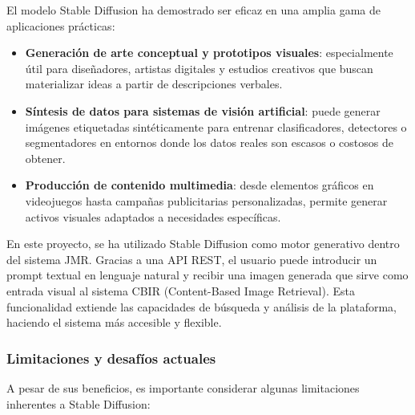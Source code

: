 El modelo Stable Diffusion ha demostrado ser eficaz en una amplia gama de aplicaciones prácticas:

\begin{itemize}
    \item \textbf{Generación de arte conceptual y prototipos visuales}: especialmente útil para diseñadores, artistas digitales y estudios creativos que buscan materializar ideas a partir de descripciones verbales.
    
    \item \textbf{Síntesis de datos para sistemas de visión artificial}: puede generar imágenes etiquetadas sintéticamente para entrenar clasificadores, detectores o segmentadores en entornos donde los datos reales son escasos o costosos de obtener.
    
    \item \textbf{Producción de contenido multimedia}: desde elementos gráficos en videojuegos hasta campañas publicitarias personalizadas, permite generar activos visuales adaptados a necesidades específicas.
\end{itemize}

En este proyecto, se ha utilizado Stable Diffusion como motor generativo dentro del sistema JMR. Gracias a una API REST, el usuario puede introducir un prompt textual en lenguaje natural y recibir una imagen generada que sirve como entrada visual al sistema CBIR (Content-Based Image Retrieval). Esta funcionalidad extiende las capacidades de búsqueda y análisis de la plataforma, haciendo el sistema más accesible y flexible.

\subsubsection{Limitaciones y desafíos actuales}

A pesar de sus beneficios, es importante considerar algunas limitaciones inherentes a Stable Diffusion:


